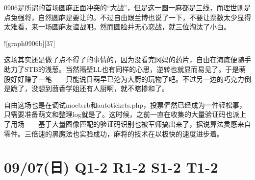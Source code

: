 
0906是所谓的首场圆麻正面冲突的“大战”，但是这一圆一麻都是三线，而理世则是点兔强将，自然圆麻是要让的。不过自由跟兰博也说了一下，不要让票数太少显得太难看，来一场圆麻友谊战吧。然而圆脸并无心恋战，就三位淘汰了小白。

![graph0906b][37]

这场其实还是做了点不得了的事情的，因为没看完冈妈的药片，自由在海底便随手助力了STB的浅葱。当然隔壁LL也有同样的心思，逆转也就显而易见了。于是萌股好好赚了一笔——只能说日萌早已沦为大厨的玩物了吧。不过另一边的巧克力倒是跪了，没想到茴香学姐还有人厨啊，就不瞎掺和了。

自由这场也是在调试moeb.rb和autotickets.php，投票俨然已经成为一件轻松事，只需要准备萌文和整理log就是了。这时候，之前一直在收集的大量验证码也派上了用场——基于大量图像匹配的验证码识别也被军师搞出来了，据说算法灵感来自零件。三倍速的黑魔法也实验成功，麻将的技术在以极快的速度进步着。

\section{09/07(日) Q1-2 R1-2 S1-2 T1-2}

